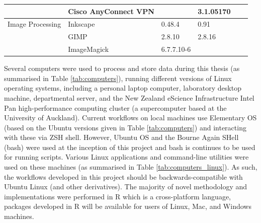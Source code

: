 \begin{table}[!ht]
{\begin{tabular}{ll|l|l|l|l|}
\cellcolor{white}                                                      & \multicolumn{1}{|l|}{Cisco AnyConnect VPN}   &                                                                     & 3.1.05170                                                         &                                                                        &                                                             \\ \hline
\cellcolor{white} Image Processing                                     & \multicolumn{1}{|l|}{Inkscape}               & 0.48.4                                                              & 0.91                                                              &                                                                        &                                                             \\ \cline{2-6} \rowcolor{gray!25}
\cellcolor{white}                                                      & \multicolumn{1}{|l|}{GIMP}                   & 2.8.10                                                              & 2.8.16                                                            &                                                                        &                                                             \\ \cline{2-6}
\cellcolor{white}                                                      & \multicolumn{1}{|l|}{ImageMagick}            & 6.7.7.10-6                                                          &                                                                   &                                                                        &                                                             \\ \hline                                
\end{tabular}
}
\end{table}

Several computers were used to process and store data during this thesis (as summarised in Table \ref{tab:computers}), running different versions of Linux operating systems, including a personal laptop computer, laboratory desktop machine, departmental server, and the New Zealand eScience Infrastructure Intel Pan high-performance computing cluster (a supercomputer based at the University of Auckland). Current workflows on local machines use Elementary OS (based on the Ubuntu versions given in Table \ref{tab:computers}) and interacting with these via ZSH shell. However, Ubuntu OS and the Bourne Again SHell (bash) were used at the inception of this project and bash is continues to be used for running scripts. Various Linux applications and command-line utilities were used on these machines (as summarised in Table \ref{tab:computers_linux}). As such, the workflows developed in this project should be backwards-compatible with Ubuntu Linux (and other derivatives). The majority of novel methodology and implementations were performed in R which is a cross-platform language, packages developed in R will be available for users of Linux, Mac, and Windows machines.  


